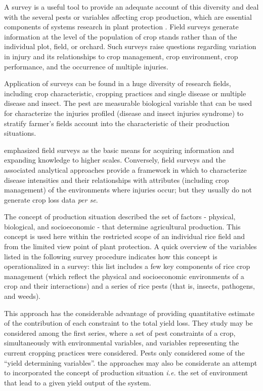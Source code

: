 A survey is a useful tool to provide an adequate account of this diversity and deal with the several pests or variables affecting crop production, which are essential components of systems research in plant protection \citet{Zadoks:1979ts}. Field surveys generate information at the level of the population of crop stands rather than of the individual plot, field, or orchard. Such surveys raise questions regarding variation in injury and its relationships to crop management, crop environment, crop performance, and the occurrence of multiple injuries.


Application of surveys can be found in a huge diversity of research fields, including crop characteristic, cropping practices and single disease or multiple disease and insect. The pest are measurable biological variable that can be used for characterize the injuries profiled (disease and insect injuries syndrome) to stratify farmer's fields account into the characteristic of their production situations.

\cite{savary1995use} emphasized field surveys as the basic means for acquiring information and expanding knowledge to higher scales. Conversely, field surveys and the associated analytical approaches provide a framework in which to characterize disease intensities and their relationships with attributes (including crop management) of the environments where injuries occur; but they usually do not generate crop loss data \textit{per se}.


The concept of production situation described the set of factors - physical, biological, and socioeconomic - that determine agricultural production. This concept is used here within the restricted scope of an individual rice field and from the limited view point of plant protection. A quick overview of the variables listed in the following survey procedure indicates how this concept is operationalized in a survey: this list includes a few key components of rice crop management (which reflect the physical and socioeconomic environments of a crop and their interactions) and a series of rice pests (that is, insects, pathogens, and weeds).

This approach has the considerable advantage of providing quantitative estimate of the contribution of each constraint to the total yield loss. They study may be considered among the first series, where a set of pest constraints of a crop, simultaneously with environmental variables, and variables representing the current cropping practices were considered. Pests only considered some of the ``yield determining variables''. the approaches may also be considerate an attempt to incorporated the concept of production situation \textit{i.e.} the set of environment that lead to a given yield output of the system. 


